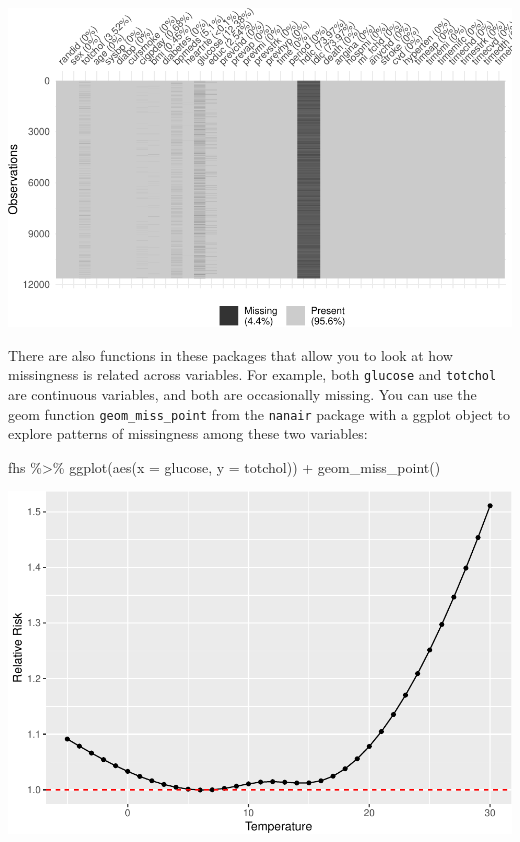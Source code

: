 \documentclass[
]{book}
\newenvironment{Shaded}{\begin{snugshade}}{\end{snugshade}}
\newcommand{\AttributeTok}[1]{\textcolor[rgb]{0.77,0.63,0.00}{#1}}
\newcommand{\FunctionTok}[1]{\textcolor[rgb]{0.00,0.00,0.00}{#1}}
\newcommand{\NormalTok}[1]{#1}
\newcommand{\SpecialCharTok}[1]{\textcolor[rgb]{0.00,0.00,0.00}{#1}}
\begin{document}
\includegraphics{adv_epi_analysis_files/figure-latex/unnamed-chunk-74-1.pdf}

There are also functions in these packages that allow you to look at how
missingness is related across variables. For example, both \texttt{glucose} and
\texttt{totchol} are continuous variables, and both are occasionally missing. You
can use the geom function \texttt{geom\_miss\_point} from the \texttt{nanair} package
with a ggplot object to explore patterns of missingness among these two
variables:

\begin{Shaded}
\begin{Highlighting}[]
\NormalTok{fhs }\SpecialCharTok{\%\textgreater{}\%} 
  \FunctionTok{ggplot}\NormalTok{(}\FunctionTok{aes}\NormalTok{(}\AttributeTok{x =}\NormalTok{ glucose, }\AttributeTok{y =}\NormalTok{ totchol)) }\SpecialCharTok{+} 
  \FunctionTok{geom\_miss\_point}\NormalTok{()}
\end{Highlighting}
\end{Shaded}

\includegraphics{adv_epi_analysis_files/figure-latex/unnamed-chunk-75-1.pdf}
\end{document}
